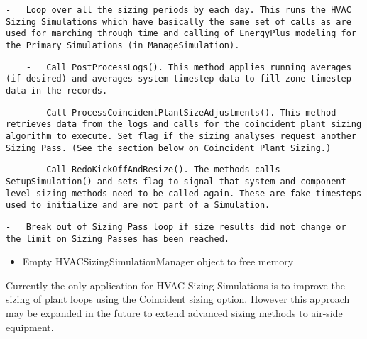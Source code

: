 \begin{lstlisting}
-   Loop over all the sizing periods by each day. This runs the HVAC Sizing Simulations which have basically the same set of calls as are used for marching through time and calling of EnergyPlus modeling for the Primary Simulations (in ManageSimulation).
\end{lstlisting}

\begin{lstlisting}
    -   Call PostProcessLogs(). This method applies running averages (if desired) and averages system timestep data to fill zone timestep data in the records.
\end{lstlisting}

\begin{lstlisting}
    -   Call ProcessCoincidentPlantSizeAdjustments(). This method retrieves data from the logs and calls for the coincident plant sizing algorithm to execute. Set flag if the sizing analyses request another Sizing Pass. (See the section below on Coincident Plant Sizing.)
\end{lstlisting}

\begin{lstlisting}
    -   Call RedoKickOffAndResize(). The methods calls SetupSimulation() and sets flag to signal that system and component level sizing methods need to be called again. These are fake timesteps used to initialize and are not part of a Simulation.
\end{lstlisting}

\begin{lstlisting}
-   Break out of Sizing Pass loop if size results did not change or the limit on Sizing Passes has been reached.
\end{lstlisting}

\begin{itemize}
\tightlist
\item
  Empty HVACSizingSimulationManager object to free memory
\end{itemize}

Currently the only application for HVAC Sizing Simulations is to improve the sizing of plant loops using the Coincident sizing option. However this approach may be expanded in the future to extend advanced sizing methods to air-side equipment.
